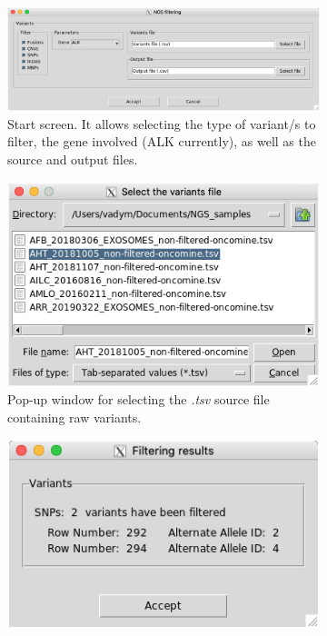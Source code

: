 \begin{figure}[ht]
    \centering
    \begin{subfigure}{\textwidth}
        \centering
        \includegraphics[width=\textwidth]{Images/chapter_4/GUI_1.png}
        \caption{Start screen. It allows selecting the type of variant\slash s to filter, the gene involved (ALK currently), as well as the source and output files. \\}
        \label{fig:GUI_1}
    \end{subfigure}
    \hfill
    \begin{subfigure}{0.47\textwidth}
        \centering
        \includegraphics[width=\textwidth]{Images/chapter_4/GUI_2.png}
        \caption{Pop-up window for selecting the \textit{.tsv} source file containing raw variants.}
        \label{fig:GUI_2}
    \end{subfigure}
    \hfill
    \hfill
    \begin{subfigure}{0.52\textwidth}
        \centering
        \includegraphics[width=\textwidth]{Images/chapter_4/GUI_3.png}

\end{subfigure}
\end{figure}
